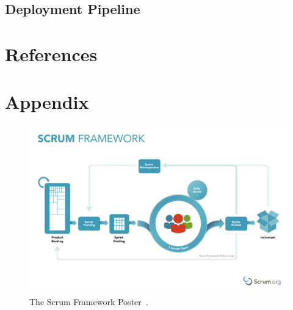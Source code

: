 \documentclass[12pt,a4paper]{article}
\theoremstyle{definition}
\begin{document}
    \subsection{Deployment Pipeline}

\newpage

\section{References}

\begin{flushleft}
    
\end{flushleft}

\newpage

\section{Appendix}

    \begin{figure}[H]
        \centering
        \includegraphics[scale=0.4]{img/ScrumFramework.pdf}
        \caption{The Scrum Framework Poster~\cite{ScrumOrgPoster}.}
        \label{fig:ScrumOrgPoster}
    \end{figure}
\end{document}
